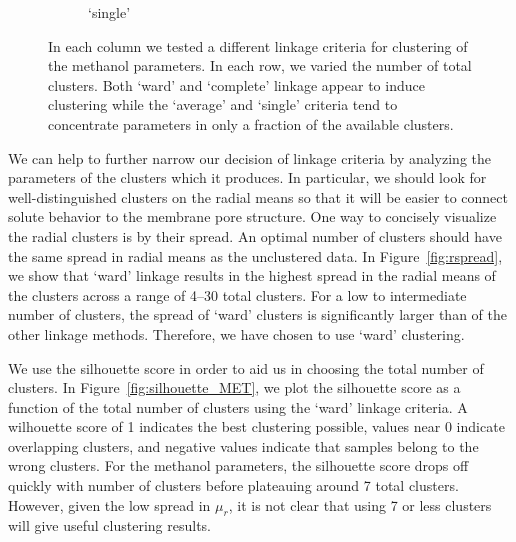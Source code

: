 \documentclass{article}
\begin{document}
\begin{figure}
\begin{subfigure}{0.24\textwidth}
  \caption{`single'}\label{fig:nclusters_single}
  \end{subfigure}
  \caption{In each column we tested a different linkage criteria for clustering
  of the methanol parameters. In each row, we varied the number of total clusters. 
  Both `ward' and `complete' linkage appear to induce clustering
  while the `average' and `single' criteria tend to concentrate parameters in
  only a fraction of the available clusters.}\label{fig:linkages}
  \end{figure}
  
  We can help to further narrow our decision of linkage criteria by analyzing 
  the parameters of the clusters which it produces. In particular, we should 
  look for well-distinguished clusters on the radial means so that it will be
  easier to connect solute behavior to the membrane pore structure. One way to
  concisely visualize the radial clusters is by their spread. An optimal number
  of clusters should have the same spread in radial means as the unclustered
  data. In Figure~\ref{fig:rspread}, we show that `ward' linkage results in 
  the highest spread in the radial means of the clusters across a range of
  4--30 total clusters. For a low to intermediate number of clusters, the 
  spread of `ward' clusters is significantly larger than of the other linkage
  methods. Therefore, we have chosen to use `ward' clustering.
  
  We use the silhouette score in order to aid us in choosing the total number of
  clusters. In Figure~\ref{fig:silhouette_MET}, we plot the silhouette score as
  a function of the total number of clusters using the `ward' linkage criteria. 
  A wilhouette score of 1 indicates the best clustering possible, values near
  0 indicate overlapping clusters, and negative values indicate that samples belong to
  the wrong clusters. For the methanol parameters, the silhouette score drops off
  quickly with number of clusters before plateauing around 7 total clusters. 
  However, given the low spread in $\mu_r$, it is not clear that using 7 or less 
  clusters will give useful clustering results.
  
\end{document}
